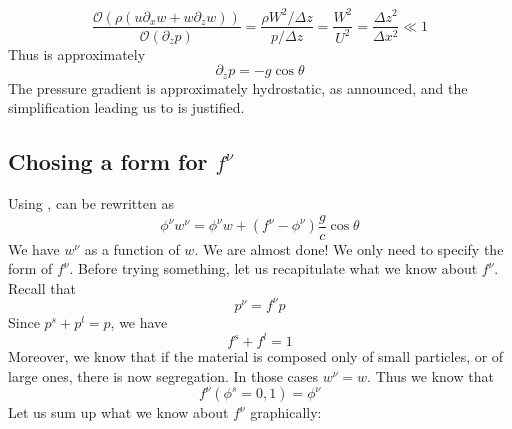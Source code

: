 \documentclass[11pt]{book}
\newcommand{\om}[1]{\ensuremath{ \mathcal{O} \left( {#1} \right) }}
\begin{document}
\begin{equation}
	\frac{\om{ \rho \left( u \partial_x w + w \partial_z w \right) }}{\om{\partial_z p}} = \frac{ \rho W^2/\Delta z}{p/\Delta z} = \frac{W^2}{U^2} = \frac{\Delta z^2}{\Delta x^2} \ll 1
\end{equation}
Thus \cite{eq:z_momentum} is approximately
\begin{equation} \label{eq:pressure_grad}
	\partial_z p = - g \cos \theta
\end{equation}
The pressure gradient is approximately hydrostatic, as announced, and the simplification leading us to \cite{eq:z_proj} is justified.

\subsection{Chosing a form for $f^\nu$}

Using \cite{eq:1},  \cite{eq:z_proj} can be rewritten as
\begin{equation}
	\phi^\nu w^\nu = \phi^\nu w + (f^\nu - \phi^\nu) \frac{g}{c} \cos \theta
\end{equation}
We have $w^\nu$ as a function of $w$. We are almost done! We only need to specify the form of $f^\nu$.
Before trying something, let us recapitulate what we know about $f^\nu$. 
Recall that 
\begin{equation}
	p^\nu = f^\nu p
\end{equation}
Since $p^s + p ^l = p$, we have
\begin{equation}
	f^s + f^l = 1
\end{equation}
Moreover, we know that if the material is composed only of small particles, or of large ones, there is now segregation. In those cases $w^\nu = w$. Thus we know that
\begin{equation}
f^\nu(\phi^s = 0, 1) = \phi^\nu
\end{equation}
Let us sum up what we know about $f^\nu$ graphically:
\end{document}
